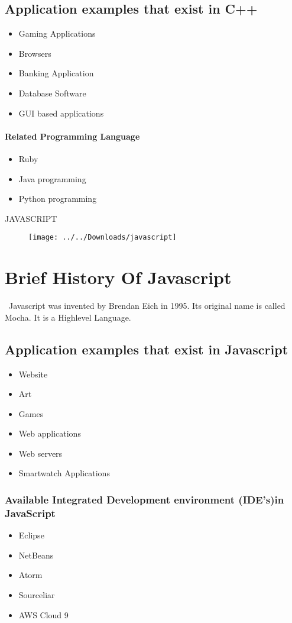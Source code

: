 \documentclass{article}
\begin{document}
\subsection{Application examples that exist in C++}
\begin{itemize}
	\item Gaming Applications
	\item Browsers
	\item Banking Application
	\item Database Software
	\item GUI based applications
\end{itemize}
\paragraph{Related Programming Language}
\begin{itemize}
	\item Ruby
	\item Java programming
	\item Python programming
\end{itemize}
\newpage
\begin{center}
	JAVASCRIPT
\begin{figure}[h]
	\texttt{[image: ../../Downloads/javascript]}
	\label{fig:javascript}
\end{figure}
\end{center}
\section{Brief History Of Javascript}
\ Javascript was invented by Brendan Eich in 1995. Its original name is called Mocha. It is a Highlevel Language.
\subsection{Application examples that exist in Javascript}
\begin{itemize}
	\item Website
	\item Art
	\item Games
	\item Web applications
	\item Web servers
	\item Smartwatch Applications
\end{itemize} 
\subsubsection{Available Integrated Development environment (IDE’s)in JavaScript}
\begin{itemize}
	\item Eclipse
	\item NetBeans
	\item Atorm
	\item Sourceliar
	\item AWS Cloud 9
\end{itemize}
\end{document}
